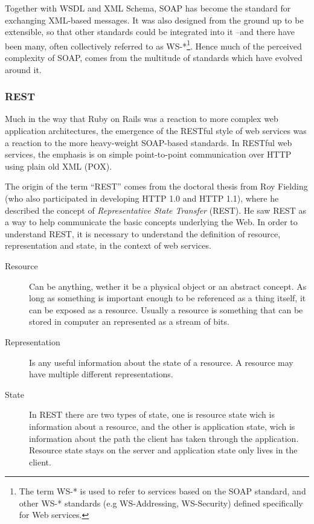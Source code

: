 Together with WSDL and XML Schema, SOAP has become the standard for exchanging XML-based messages. It was also designed from the ground up to be extensible, so that other standards could be integrated into it --and there have been many, often collectively referred to as WS-*\footnote{The term WS-* is used to refer to services based on the SOAP standard, and other WS-* standards (e.g WS-Addressing, WS-Security) defined specifically for Web services.}. Hence much of the perceived complexity of SOAP, comes from the multitude of standards which have evolved around it\cite{Spies:2008}.

\subsubsection{REST}
Much in the way that Ruby on Rails was a reaction to more complex web application architectures, the emergence of the RESTful style of web services was a reaction to the more heavy-weight SOAP-based standards. In RESTful web services, the emphasis is on simple point-to-point communication over HTTP using plain old XML (POX)\cite{Spies:2008}.

The origin of the term ``REST'' comes from the doctoral thesis from Roy Fielding\cite{Fielding00Phd} (who also participated in developing HTTP 1.0 and HTTP 1.1), where he described the concept of \textit{Representative State Transfer} (REST). He saw REST as a way to help communicate the basic concepts underlying the Web. In order to understand REST, it is necessary to understand the definition of resource, representation and state, in the context of web services.
\begin{description}
\item[Resource] Can be anything, wether it be a physical object or an abstract concept. As long as something is important enough to be referenced as a thing itself, it can be exposed as a resource. Usually a resource is something that can be stored in computer an represented as a stream of bits.
\item[Representation] Is any useful information about the state of a resource. A resource may have multiple different representations.
\item[State] In REST there are two types of state, one is resource state wich is information about a resource, and the other is application state, wich is information about the path the client has taken through the application. Resource state stays on the server and application state only lives in the client.
\end{description}

